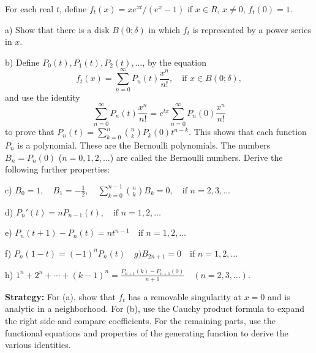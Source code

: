 \begin{problembox}
For each real \( t \), define \( f_t(x) = xe^{xt}/(e^x - 1) \) if \( x \in R \), \( x \neq 0 \), \( f_t(0) = 1 \).

a) Show that there is a disk \( B(0; \delta) \) in which \( f_t \) is represented by a power series in \( x \).

b) Define \( P_0(t), P_1(t), P_2(t), \ldots \), by the equation
\[f_t(x) = \sum_{n=0}^\infty P_n(t) \frac{x^n}{n!}, \quad \text{if } x \in B(0; \delta),\]
and use the identity
\[\sum_{n=0}^\infty P_n(t) \frac{x^n}{n!} = e^{tx} \sum_{n=0}^\infty P_n(0) \frac{x^n}{n!}\]
to prove that \( P_n(t) = \sum_{k=0}^n \binom{n}{k} P_k(0)t^{n-k} \). This shows that each function \( P_n \) is a polynomial. These are the Bernoulli polynomials. The numbers \( B_n = P_n(0) \) (\( n = 0, 1, 2, \ldots \)) are called the Bernoulli numbers. Derive the following further properties:

c) \( B_0 = 1, \quad B_1 = -\frac{1}{2}, \quad \sum_{k=0}^{n-1} \binom{n}{k} B_k = 0, \quad \text{if } n = 2, 3, \ldots \)

d) \( P_n'(t) = nP_{n-1}(t), \quad \text{if } n = 1, 2, \ldots \)

e) \( P_n(t + 1) - P_n(t) = nt^{n-1} \quad \text{if } n = 1, 2, \ldots \)

f) \( P_n(1 - t) = (-1)^n P_n(t) \quad g) B_{2n+1} = 0 \quad \text{if } n = 1, 2, \ldots \)

h) \( 1^n + 2^n + \cdots + (k - 1)^n = \frac{P_{n+1}(k) - P_{n+1}(0)}{n + 1} \quad (n = 2, 3, \ldots ) \).
\end{problembox}

\noindent\textbf{Strategy:} For (a), show that \( f_t \) has a removable singularity at \( x = 0 \) and is analytic in a neighborhood. For (b), use the Cauchy product formula to expand the right side and compare coefficients. For the remaining parts, use the functional equations and properties of the generating function to derive the various identities.

